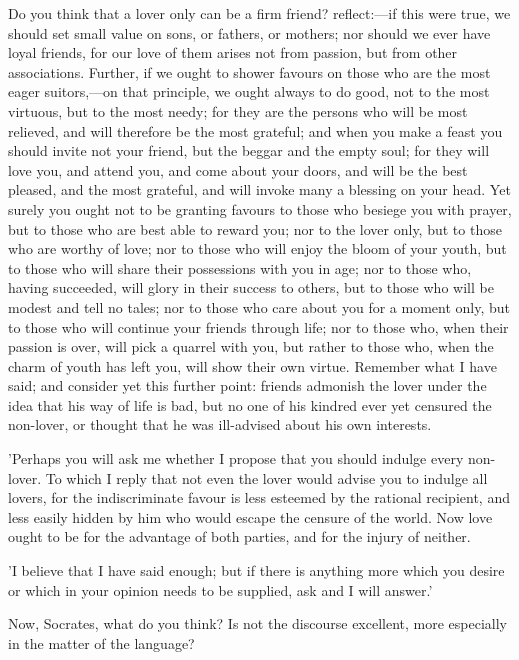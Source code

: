 \documentclass[11pt,letter]{article}
\begin{document}
\par  Do you think that a lover only can be a firm friend? reflect:—if this were true, we should set small value on sons, or fathers, or mothers; nor should we ever have loyal friends, for our love of them arises not from passion, but from other associations. Further, if we ought to shower favours on those who are the most eager suitors,—on that principle, we ought always to do good, not to the most virtuous, but to the most needy; for they are the persons who will be most relieved, and will therefore be the most grateful; and when you make a feast you should invite not your friend, but the beggar and the empty soul; for they will love you, and attend you, and come about your doors, and will be the best pleased, and the most grateful, and will invoke many a blessing on your head. Yet surely you ought not to be granting favours to those who besiege you with prayer, but to those who are best able to reward you; nor to the lover only, but to those who are worthy of love; nor to those who will enjoy the bloom of your youth, but to those who will share their possessions with you in age; nor to those who, having succeeded, will glory in their success to others, but to those who will be modest and tell no tales; nor to those who care about you for a moment only, but to those who will continue your friends through life; nor to those who, when their passion is over, will pick a quarrel with you, but rather to those who, when the charm of youth has left you, will show their own virtue. Remember what I have said; and consider yet this further point: friends admonish the lover under the idea that his way of life is bad, but no one of his kindred ever yet censured the non-lover, or thought that he was ill-advised about his own interests.

\par  'Perhaps you will ask me whether I propose that you should indulge every non-lover. To which I reply that not even the lover would advise you to indulge all lovers, for the indiscriminate favour is less esteemed by the rational recipient, and less easily hidden by him who would escape the censure of the world. Now love ought to be for the advantage of both parties, and for the injury of neither.

\par  'I believe that I have said enough; but if there is anything more which you desire or which in your opinion needs to be supplied, ask and I will answer.'

\par  Now, Socrates, what do you think? Is not the discourse excellent, more especially in the matter of the language?
\end{document}
